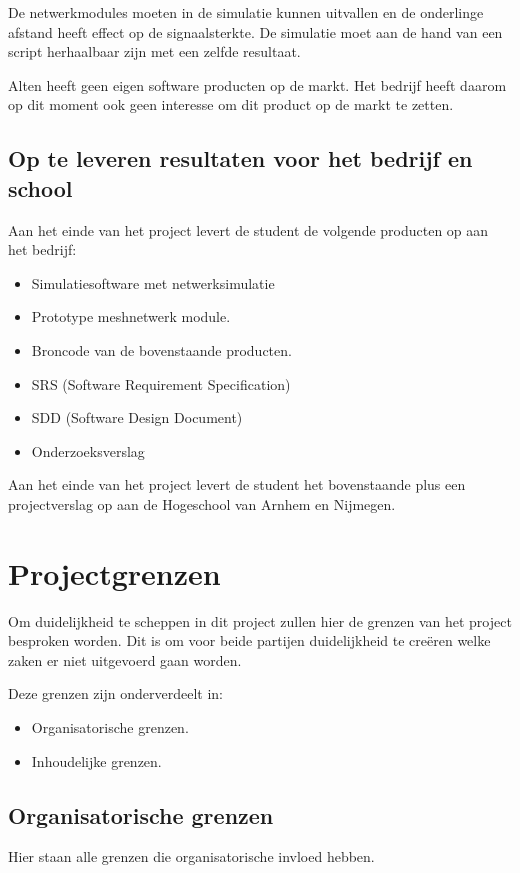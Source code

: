 \documentclass[a4paper, 11pt, oneside]{report}
\begin{document}
De netwerkmodules moeten in de simulatie kunnen uitvallen en de onderlinge afstand heeft effect op de signaalsterkte.
De simulatie moet aan de hand van een script herhaalbaar zijn met een zelfde resultaat.
 

Alten heeft geen eigen software producten op de markt.
Het bedrijf heeft daarom op dit moment ook geen interesse om dit product op de markt te zetten.

\section{Op te leveren resultaten voor het bedrijf en school}

Aan het einde van het project levert de student de volgende producten op aan het bedrijf:

\begin{itemize}
\item Simulatiesoftware met netwerksimulatie
\item Prototype meshnetwerk module.
\item Broncode van de bovenstaande producten. 
\item SRS (Software Requirement Specification)
\item SDD (Software Design Document)
\item Onderzoeksverslag
\end{itemize}

Aan het einde van het project levert de student het bovenstaande plus een projectverslag op aan de Hogeschool van Arnhem en Nijmegen.

\chapter{Projectgrenzen}
\label{chapter:projectgrenzen}
Om duidelijkheid te scheppen in dit project zullen hier de grenzen van het project besproken worden.
Dit is om voor beide partijen duidelijkheid te creëren welke zaken er niet uitgevoerd gaan worden. 

Deze grenzen zijn onderverdeelt in:

\begin{itemize}
	\item Organisatorische grenzen.
	\item Inhoudelijke grenzen.
\end{itemize}

\section{Organisatorische grenzen}
Hier staan alle grenzen die organisatorische invloed hebben. 
\end{document}
